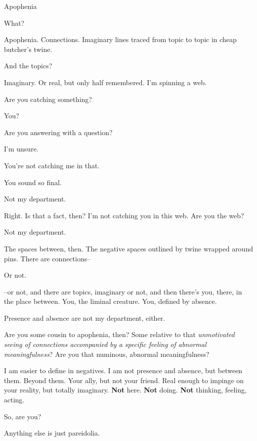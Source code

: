 Apophenia

\begin{ally}
What?
\end{ally}
Apophenia. Connections. Imaginary lines traced from topic to topic in cheap butcher's twine.

\begin{ally}
And the topics?
\end{ally}
Imaginary. Or real, but only half remembered. I'm spinning a web.

\begin{ally}
Are you catching something?
\end{ally}
You?

\begin{ally}
Are you answering with a question?
\end{ally}
I'm unsure.

\begin{ally}
You're not catching me in that.
\end{ally}
You sound so final.

\begin{ally}
Not my department.
\end{ally}
Right. Is that a fact, then? I'm not catching you in this web. Are you the web?

\begin{ally}
Not my department.
\end{ally}
The spaces between, then. The negative spaces outlined by twine wrapped around pins. There are connections--

\begin{ally}
Or not.
\end{ally}
--or not, and there are topics, imaginary or not, and then there's you, there, in the place between. You, the liminal creature. You, defined by absence.

\begin{ally}
Presence and absence are not my department, either.
\end{ally}
Are you some cousin to apophenia, then? Some relative to that \emph{unmotivated seeing of connections accompanied by a specific feeling of abnormal meaningfulness}? Are you that numinous, abnormal meaningfulness?

\begin{ally}
I am easier to define in negatives. I am not presence and absence, but between them. Beyond them. Your ally, but not your friend. Real enough to impinge on your reality, but totally imaginary. \textbf{Not} here. \textbf{Not} doing. \textbf{Not} thinking, feeling, acting.
\end{ally}
So, are you?

\begin{ally}
Anything else is just pareidolia.
\end{ally}
\newpage
